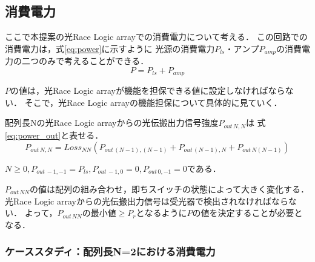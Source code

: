 \subsection{消費電力}
ここで本提案の光Race Logic arrayでの消費電力について考える．
この回路での消費電力は，式\ref{eq:power}に示すように
$光源の消費電力P_{ls}・アンプP_{amp}$の消費電力の二つのみで考えることができる．
\begin{equation}
P=P_{ls}+P_{amp}
\label{eq:power}
\end{equation}

$P$の値は，光Race Logic arrayが機能を担保できる値に設定しなければならない．
そこで，光Race Logic arrayの機能担保について具体的に見ていく．

配列長Nの光Race Logic arrayからの光伝搬出力信号強度$P_{out\,N,N}$は
式\ref{eq:power_out}と表せる．
\begin{equation}
P_{out\,N,N}=Loss_{NN}(P_{out\,(N-1),(N-1)}+P_{out\,(N-1),N}+P_{out\,N(N-1)})
\label{eq:power_out}
\end{equation}

$N \geq 0,P_{out\,-1,-1}=P_{ls},P_{out\,-1,0}=0,P_{out\,0,-1}=0である．$

$P_{out\,NN}$の値は配列の組み合わせ，即ちスイッチの状態によって大きく変化する．
光Race Logic arrayからの光伝搬出力信号は受光器で検出されなければならない．
よって，$P_{out\,NN}の最小値 \geq P_{r}となるようにP$の値を決定することが必要となる．

\subsubsection{ケーススタディ：配列長N=2における消費電力}

